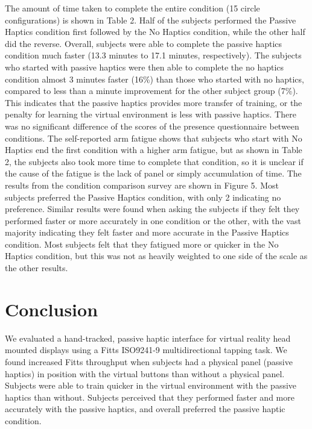 \documentclass[]{aiaa-tc}%
\begin{document}
The amount of time taken to complete the entire condition (15 circle configurations) is shown in Table 2.
Half of the subjects performed the Passive Haptics condition first followed by the No Haptics condition, while the other half did the reverse.
Overall, subjects were able to complete the passive haptics condition much faster (13.3 minutes to 17.1 minutes, respectively).
The subjects who started with passive haptics were then able to complete the no haptics condition almost 3 minutes faster (16\%) than those who started with no haptics, compared to less than a minute improvement for the other subject group (7\%).
This indicates that the passive haptics provides more transfer of training, or the penalty for learning the virtual environment is less with passive haptics.
There was no significant difference of the scores of the presence questionnaire between conditions.
The self-reported arm fatigue shows that subjects who start with No Haptics end the first condition with a higher arm fatigue, but as shown in Table 2, the subjects also took more time to complete that condition, so it is unclear if the cause of the fatigue is the lack of panel or simply accumulation of time.
The results from the condition comparison survey are shown in Figure 5.
Most subjects preferred the Passive Haptics condition, with only 2 indicating no preference.
Similar results were found when asking the subjects if they felt they performed faster or more accurately in one condition or the other, with the vast majority indicating they felt faster and more accurate in the Passive Haptics condition.
Most subjects felt that they fatigued more or quicker in the No Haptics condition, but this was not as heavily weighted to one side of the scale as the other results.


\section{Conclusion}
We evaluated a hand-tracked, passive haptic interface for virtual reality head mounted displays using a Fitts ISO9241-9 multidirectional tapping task.
We found increased Fitts throughput when subjects had a physical panel (passive haptics) in position with the virtual buttons than without a physical panel.
Subjects were able to train quicker in the virtual environment with the passive haptics than without.
Subjects perceived that they performed faster and more accurately with the passive haptics, and overall preferred the passive haptic condition.





\end{document}
